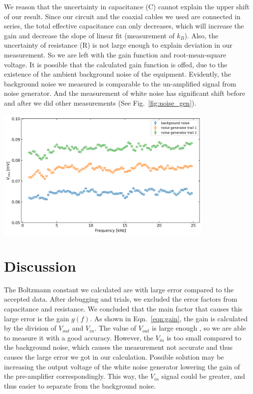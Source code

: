 \documentclass[12pt]{article}
\begin{document}
We reason that the uncertainty in capacitance (C) cannot explain the upper shift of our result. Since our circuit and the coaxial cables we used are connected in series, the total effective capacitance can only decreases, which will increase the gain and decrease the slope of linear fit (measurement of $k_B$). Also, the uncertainty of resistance (R) is not large enough to explain deviation in our measurement. So we are left with the gain function and root-mean-square voltage. It is possible that the calculated gain function is offed, due to the existence of the ambient background noise of the equipment. Evidently, the background noise we measured is comparable to the un-amplified signal from noise generator. And the measurement of white noise has significant shift before and after we did other measurements (See Fig.~\ref{fig:noise_gen}). 

\begin{center}
    \includegraphics[width = 0.8\textwidth]{images/nosie_gen_trail.png}
    \label{fig:noise_gen}
\end{center}


\section{Discussion}
\quad The Boltzmann constant we calculated are with large error compared to the accepted data. After debugging and trials, we excluded the error factors from capacitance and resistance. We concluded that the main factor that causes this large error is the gain $g(f)$. As shown in Eqn.~\ref{eqn:gain}, the gain is calculated by the division of $V_{out}$ and $V_{in}$. The value of $V_{out}$ is large enough , so we are able to measure it with a good accuracy. However, the $V_{in}$ is too small compared to the background noise, which causes the measurement not accurate and thus causes the large error we got in our calculation. Possible solution may be increasing the output voltage of the white noise generator lowering the gain of the pre-amplifier correspondingly. This way, the $V_{in}$ signal could be greater, and thus easier to separate from the background noise. 

\end{document}
